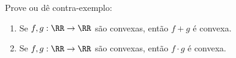 Prove ou dê contra-exemplo:
	\begin{enumerate}
		\item Se $f, g : \RR \to \RR$ são convexas, então $f+g$ é convexa.
		\item Se $f, g : \RR \to \RR$ são convexas, então $f\cdot g$ é convexa.
	\end{enumerate}